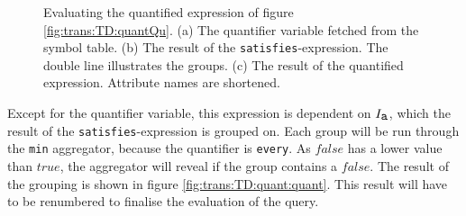 \begin{myExample}
\begin{figure}[h]
\caption[Evaluating the quantified expression]{Evaluating the quantified expression of figure
\ref{fig:trans:TD:quantQu}. (a) The quantifier variable fetched from the symbol table. (b) The result of the
\texttt{satisfies}-expression. The double line illustrates the groups. (c) The result of the quantified
expression. Attribute names are shortened. \label{fig:trans:TD:quantInter} }
\end{figure}

Except for the quantifier variable, this expression is dependent on $I_{\mbox{\texttt{a}}}$, which the result of
the \texttt{satisfies}-expression is grouped on. Each group will be run through the \texttt{min} aggregator,
because the quantifier is \texttt{every}. As $false$ has a lower value than $true$, the aggregator will reveal if
the group contains a $false$. The result of the grouping is shown in figure \ref{fig:trans:TD:quant:quant}. This
result will have to be renumbered to finalise the evaluation of the query.
\end{myExample}